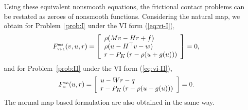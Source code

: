 Using these equivalent nonsmooth equations, the frictional contact problems can be restated as zeroes of nonsmooth functions. Considering the natural map, we obtain for Problem~\ref{prob:I} under the VI form (\ref{eq:vi-I}),
\begin{equation}
  \label{eq:natural-I}
  F_\vione^\nat(v,u,r) = \left[
  \begin{array}{l}
    \rho (Mv - Hr + f) \\
    \rho (u-H^\top v -w) \\
    r - P_{K}\left(r  - \rho (u  + g(u))\right)
  \end{array}\right] = 0,
\end{equation}
and  for Problem~\ref{prob:II} under the VI form (\ref{eq:vi-II}),
\begin{equation}
  \label{eq:natural-II}
  F_\vitwo^\nat(u,r) =   \left[
  \begin{array}{l} 
    u - W r -q\\
    r - P_{K}\left(r  - \rho (u + g(u))\right) 
  \end{array}\right] 
  = 0.
\end{equation}
The normal map based formulation are also obtained in the same way. 

